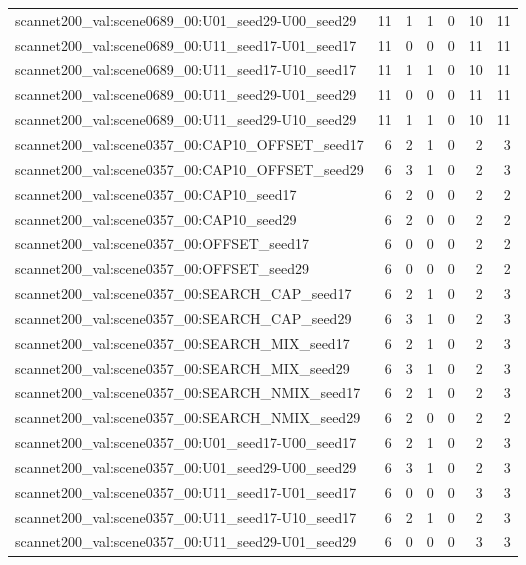 \begin{table}[t]
\begin{tabular}{lrrrrrr}
scannet200\_val:scene0689\_00:U01\_seed29-U00\_seed29 & 11 & 1 & 1 & 0 & 10 & 11 \\
scannet200\_val:scene0689\_00:U11\_seed17-U01\_seed17 & 11 & 0 & 0 & 0 & 11 & 11 \\
scannet200\_val:scene0689\_00:U11\_seed17-U10\_seed17 & 11 & 1 & 1 & 0 & 10 & 11 \\
scannet200\_val:scene0689\_00:U11\_seed29-U01\_seed29 & 11 & 0 & 0 & 0 & 11 & 11 \\
scannet200\_val:scene0689\_00:U11\_seed29-U10\_seed29 & 11 & 1 & 1 & 0 & 10 & 11 \\
scannet200\_val:scene0357\_00:CAP10\_OFFSET\_seed17 & 6 & 2 & 1 & 0 & 2 & 3 \\
scannet200\_val:scene0357\_00:CAP10\_OFFSET\_seed29 & 6 & 3 & 1 & 0 & 2 & 3 \\
scannet200\_val:scene0357\_00:CAP10\_seed17 & 6 & 2 & 0 & 0 & 2 & 2 \\
scannet200\_val:scene0357\_00:CAP10\_seed29 & 6 & 2 & 0 & 0 & 2 & 2 \\
scannet200\_val:scene0357\_00:OFFSET\_seed17 & 6 & 0 & 0 & 0 & 2 & 2 \\
scannet200\_val:scene0357\_00:OFFSET\_seed29 & 6 & 0 & 0 & 0 & 2 & 2 \\
scannet200\_val:scene0357\_00:SEARCH\_CAP\_seed17 & 6 & 2 & 1 & 0 & 2 & 3 \\
scannet200\_val:scene0357\_00:SEARCH\_CAP\_seed29 & 6 & 3 & 1 & 0 & 2 & 3 \\
scannet200\_val:scene0357\_00:SEARCH\_MIX\_seed17 & 6 & 2 & 1 & 0 & 2 & 3 \\
scannet200\_val:scene0357\_00:SEARCH\_MIX\_seed29 & 6 & 3 & 1 & 0 & 2 & 3 \\
scannet200\_val:scene0357\_00:SEARCH\_NMIX\_seed17 & 6 & 2 & 1 & 0 & 2 & 3 \\
scannet200\_val:scene0357\_00:SEARCH\_NMIX\_seed29 & 6 & 2 & 0 & 0 & 2 & 2 \\
scannet200\_val:scene0357\_00:U01\_seed17-U00\_seed17 & 6 & 2 & 1 & 0 & 2 & 3 \\
scannet200\_val:scene0357\_00:U01\_seed29-U00\_seed29 & 6 & 3 & 1 & 0 & 2 & 3 \\
scannet200\_val:scene0357\_00:U11\_seed17-U01\_seed17 & 6 & 0 & 0 & 0 & 3 & 3 \\
scannet200\_val:scene0357\_00:U11\_seed17-U10\_seed17 & 6 & 2 & 1 & 0 & 2 & 3 \\
scannet200\_val:scene0357\_00:U11\_seed29-U01\_seed29 & 6 & 0 & 0 & 0 & 3 & 3 \\

\end{tabular}
\end{table}
